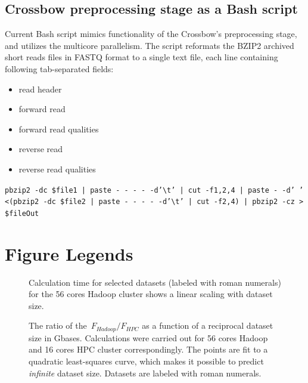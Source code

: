 \documentclass[10pt]{article}
\begin{document}
\subsection*{Crossbow preprocessing stage as a Bash script}
Current Bash script mimics functionality of the Crossbow's preprocessing stage, and utilizes the multicore parallelism. The script reformats the BZIP2 archived short reads files in FASTQ format to a single text file, each line containing following tab-separated fields:
\begin{itemize}
\item read header
\item forward read
\item forward read qualities
\item reverse read
\item reverse read qualities
\end{itemize}

\texttt {pbzip2 -dc  \${file1} | paste - - - - -d'\textbackslash t' | cut -f1,2,4 | paste - -d' ' <(pbzip2 -dc  \${file2} | paste - - - - -d'\textbackslash t' | cut -f2,4) | pbzip2 -cz > \${fileOut}}






\section*{Figure Legends}

\begin{figure}[!ht]
	
	\caption{Calculation time for selected datasets (labeled with roman numerals) for the 56 cores Hadoop cluster shows a linear scaling with dataset size. }
	\label{fig:fig1}
\end{figure}


\begin{figure}[!ht]
	
	\caption{The ratio of the~$F_{Hadoop}/F_{HPC}$ as a function of a reciprocal dataset size in Gbases. Calculations were carried out for 56 cores Hadoop and 16 cores HPC cluster correspondingly.
The points are fit to a quadratic least-squares curve, which makes it possible to predict {\it infinite} dataset size. Datasets are labeled with roman numerals.}
	\label{fig:fig2}
\end{figure}
\end{document}
